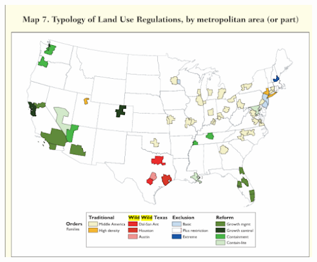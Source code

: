 \documentclass[
  12pt]{article}
\begin{document}
\includegraphics{images/unnamed (1).png}


  
\end{document}
